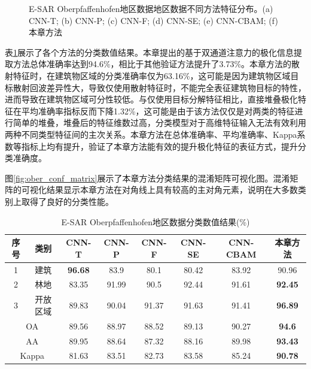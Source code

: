 \begin{figure}[ht!]
  \caption{E-SAR Oberpfaffenhofen地区数据地区数据不同方法特征分布。(a) CNN-T; (b) CNN-P; (c) CNN-F; (d) CNN-SE; (e) CNN-CBAM; (f) 本章方法}
  \label{fig:ober-tSNE}
\end{figure}

表\ref{tab:ober_res}展示了各个方法的分类数值结果。本章提出的基于双通道注意力的极化信息提取方法总体准确率达到94.6\%，相比于其他验证方法提升了3.73\%。本章方法的散射特征时，在建筑物区域的分类准确率仅为63.16\%，这可能是因为建筑物区域目标散射回波差异性大，导致仅使用散射特征时，不能完全表征建筑物目标的特性，进而导致在建筑物区域可分性较低。与仅使用目标分解特征相比，直接堆叠极化特征在平均准确率指标反而下降1.32\%，这可能是由于该方法仅仅是对两类的特征进行简单的堆叠，堆叠后的特征维数过高，分类模型对于高维特征输入无法有效利用两种不同类型特征间的主次关系。本章方法在总体准确率、平均准确率、Kappa系数等指标上均有提升，验证了本章方法能有效的提升极化特征的表征方式，提升分类准确度。

图\ref{fig:ober_conf_matrix}展示了本章方法分类结果的混淆矩阵可视化图。混淆矩阵的可视化结果显示本章方法在对角线上具有较高的主对角元素，说明在大多数类别上取得了良好的分类性能。

\begin{table}[ht!]
  \caption{E-SAR Oberpfaffenhofen地区数据分类数值结果(\%)}
  \label{tab:ober_res}
  \begin{tabular}{cccccccc}
    \toprule[1.5bp]
    序号                        & 类别    & CNN-T          & CNN-P & CNN-F & CNN-SE & CNN-CBAM       & 本章方法           \\
    \midrule[0.75bp]
    1                         & 建筑    & \textbf{96.68} & 83.9  & 80.1  & 80.42  & 83.92          & 90.96          \\
    2                         & 林地    & 83.35          & 91.99 & 90.5  & 92.44  & 91.61          & \textbf{92.45} \\
    3                         & 开放区域  & 89.83          & 90.04 & 91.37 & 91.63  & 91.41          & \textbf{96.89} \\
    \midrule[0.75bp]
    \multicolumn{2}{c}{OA}    & 89.56 & 88.97          & 88.52 & 89.13 & 90.27  & \textbf{94.6}                   \\
    \multicolumn{2}{c}{AA}    & 89.95 & 88.64          & 87.32 & 88.16 & 89.98  & \textbf{93.43}                  \\
    \multicolumn{2}{c}{Kappa} & 81.63 & 83.51          & 82.73 & 83.58 & 85.24  & \textbf{90.78}                  \\
    \bottomrule[1.5bp]
  \end{tabular}
\end{table}

